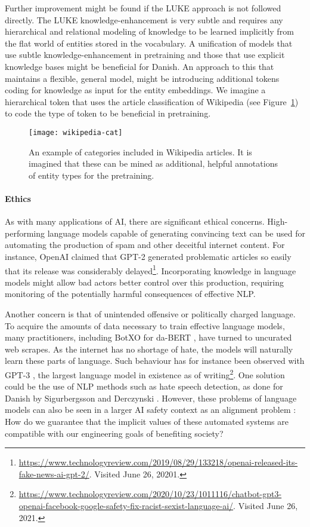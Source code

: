 \documentclass[main.tex]{subfiles}
\begin{document}
Further improvement might be found if the LUKE approach is not followed directly.
The LUKE knowledge-enhancement is very subtle and requires any hierarchical and relational modeling of knowledge to be learned implicitly from the flat world of entities stored in the vocabulary.
A unification of models that use subtle knowledge-enhancement in pretraining and those that use explicit knowledge bases might be beneficial for Danish.
An approach to this that maintains a flexible, general model, might be introducing additional tokens coding for knowledge as input for the entity embeddings.
We imagine a hierarchical token that uses the article classification of Wikipedia (see Figure~\ref{fig:wikipedia-cat}) to code the type of token to be beneficial in pretraining.
\begin{figure}[H]
    \centering
    \texttt{[image: wikipedia-cat]}
    \caption{An example of categories included in Wikipedia articles. It is imagined that these can be mined as additional, helpful annotations of entity types for the pretraining.}
    \label{fig:wikipedia-cat}
\end{figure}\noindent

\paragraph{Ethics}
As with many applications of AI, there are significant ethical concerns.
High-performing language models capable of generating convincing text can be used for automating the production of spam and other deceitful internet content.
For instance, OpenAI claimed that GPT-2 \cite{Radford2019gpt2} generated problematic articles so easily that its release was considerably delayed\footnote{\url{https://www.technologyreview.com/2019/08/29/133218/openai-released-its-fake-news-ai-gpt-2/}. Visited June 26, 20201.}.
Incorporating knowledge in language models might allow bad actors better control over this production, requiring monitoring of the potentially harmful consequences of effective NLP.

Another concern is that of unintended offensive or politically charged language.
To acquire the amounts of data necessary to train effective language models, many practitioners, including BotXO for da-BERT \cite{botxo2019dabert}, have turned to uncurated web scrapes.
As the internet has no shortage of hate, the models will naturally learn these parts of language.
Such behaviour has for instance been observed with GPT-3 \cite{brown2020language}, the largest language model in existence as of writing\footnote{\url{https://www.technologyreview.com/2020/10/23/1011116/chatbot-gpt3-openai-facebook-google-safety-fix-racist-sexist-language-ai/}. Visited June 26, 2021.}.
One solution could be the use of NLP methods such as hate speech detection, as done for Danish by Sigurbergsson and Derczynski \cite{sigurbergsson-derczynski-2020-offensive}.
However, these problems of language models can also be seen in a larger AI safety context as an alignment problem \cite{taylor2020alignment}:
How do we guarantee that the implicit values of these automated systems are compatible with our engineering goals of benefiting society?
\end{document}
